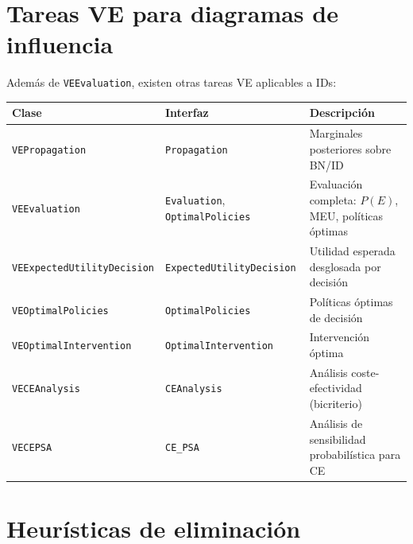 \documentclass[11pt,a4paper]{article}
\newcommand{\clase}[1]{\texttt{#1}}
\begin{document}
\section{Tareas VE para diagramas de influencia}

Adem\'{a}s de \clase{VEEvaluation}, existen otras tareas VE aplicables a IDs:

\begin{longtable}{p{4.5cm} p{3.5cm} p{6.5cm}}
\toprule
\textbf{Clase} & \textbf{Interfaz} & \textbf{Descripci\'{o}n} \\
\midrule
\endhead

\clase{VEPropagation} & \clase{Propagation} &
  Marginales posteriores sobre BN/ID \\
\addlinespace

\clase{VEEvaluation} & \clase{Evaluation}, \clase{OptimalPolicies} &
  Evaluaci\'{o}n completa: $P(E)$, MEU, pol\'{i}ticas \'{o}ptimas \\
\addlinespace

\clase{VEExpectedUtility\-Decision} & \clase{ExpectedUtility\-Decision} &
  Utilidad esperada desglosada por decisi\'{o}n \\
\addlinespace

\clase{VEOptimalPolicies} & \clase{OptimalPolicies} &
  Pol\'{i}ticas \'{o}ptimas de decisi\'{o}n \\
\addlinespace

\clase{VEOptimalIntervention} & \clase{OptimalIntervention} &
  Intervenci\'{o}n \'{o}ptima \\
\addlinespace

\clase{VECEAnalysis} & \clase{CEAnalysis} &
  An\'{a}lisis coste-efectividad (bicriterio) \\
\addlinespace

\clase{VECEPSA} & \clase{CE\_PSA} &
  An\'{a}lisis de sensibilidad probabil\'{i}stica para CE \\
\bottomrule
\end{longtable}

\section{Heur\'{i}sticas de eliminaci\'{o}n}
\end{document}

